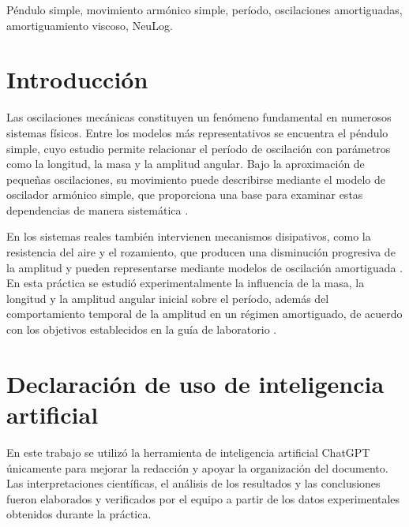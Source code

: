 \documentclass[conference]{Plantilla_LATEX/IEEEtran}
\begin{document}
\begin{IEEEkeywords}
Péndulo simple, movimiento armónico simple, período, oscilaciones amortiguadas, amortiguamiento viscoso, NeuLog.
\end{IEEEkeywords}

\section{Introducción}
Las oscilaciones mecánicas constituyen un fenómeno fundamental en numerosos sistemas físicos. Entre los modelos más representativos se encuentra el péndulo simple, cuyo estudio permite relacionar el período de oscilación con parámetros como la longitud, la masa y la amplitud angular. Bajo la aproximación de pequeñas oscilaciones, su movimiento puede describirse mediante el modelo de oscilador armónico simple, que proporciona una base para examinar estas dependencias de manera sistemática \cite{young2018}.

En los sistemas reales también intervienen mecanismos disipativos, como la resistencia del aire y el rozamiento, que producen una disminución progresiva de la amplitud y pueden representarse mediante modelos de oscilación amortiguada \cite{young2018}. En esta práctica se estudió experimentalmente la influencia de la masa, la longitud y la amplitud angular inicial sobre el período, además del comportamiento temporal de la amplitud en un régimen amortiguado, de acuerdo con los objetivos establecidos en la guía de laboratorio \cite{uca2026}.











\section*{Declaración de uso de inteligencia artificial}
En este trabajo se utilizó la herramienta de inteligencia artificial ChatGPT únicamente para mejorar la redacción y apoyar la organización del documento. Las interpretaciones científicas, el análisis de los resultados y las conclusiones fueron elaborados y verificados por el equipo a partir de los datos experimentales obtenidos durante la práctica.



\end{document}
